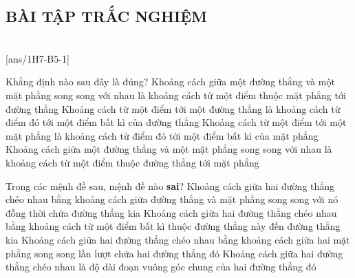 \subsection{BÀI TẬP TRẮC NGHIỆM}

 \\
\setcounter{ex}{0}
[ans/1H7-B5-1]
\begin{ex}%
	Khẳng định nào sau đây là đúng?
	\choice
	{Khoảng cách giữa một đường thẳng và một mặt phẳng song song với nhau là khoảng cách từ một điểm thuộc mặt phẳng tới đường thẳng}
	{Khoảng cách từ một điểm tới một đường thẳng là khoảng cách từ điểm đó tới một điểm bất kì của đường thẳng}
	{Khoảng cách từ một điểm tới một mặt phẳng là khoảng cách từ điểm đó tới một điểm bất kì của mặt phẳng}
	{\True Khoảng cách giữa một đường thẳng và một mặt phẳng song song với nhau là khoảng cách từ một điểm thuộc đường thẳng tới mặt phẳng}
\end{ex}

\begin{ex}%
	Trong các mệnh đề sau, mệnh đề nào \textbf{sai}?
	\choice
	{Khoảng cách giữa hai đường thẳng chéo nhau bằng khoảng cách giữa đường thẳng và mặt phẳng song song với nó đồng thời chứa đường thẳng kia}
	{\True Khoảng cách giữa hai đường thẳng chéo nhau bằng khoảng cách từ một điểm bất kì thuộc đường thẳng này đến đường thẳng kia}
	{Khoảng cách giữa hai đường thẳng chéo nhau bằng khoảng cách giữa hai mặt phẳng song song lần lượt chứa hai đường thẳng đó}
	{Khoảng cách giữa hai đường thẳng chéo nhau là độ dài đoạn vuông góc chung của hai đường thẳng đó}
\end{ex}

